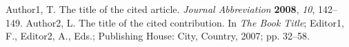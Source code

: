 \documentclass[sensors,article,submit,moreauthors,pdftex]{Definitions/mdpi}
\begin{document}


%

\begin{thebibliography}{999}
Author1, T. The title of the cited article. {\em Journal Abbreviation} {\bf 2008}, {\em 10}, 142--149.
Author2, L. The title of the cited contribution. In {\em The Book Title}; Editor1, F., Editor2, A., Eds.; Publishing House: City, Country, 2007; pp. 32--58.
\end{thebibliography}





\end{document}

